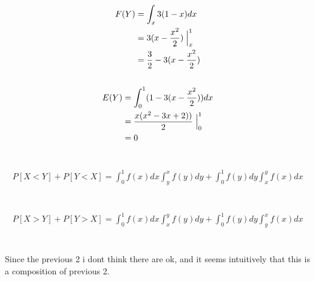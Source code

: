 \documentclass[12pt, a4paper]{article}
\begin{document}
\subsection{}
\begin{subequations}
  \begin{align}
    F(Y) &= \int_x 3(1 - x) dx \\
         &= 3(x - \frac{x^2}{2})\Bigm|_x^1\\
         &= \frac{3}{2} - 3(x - \frac{x^2}{2})
  \end{align}
\end{subequations}

\subsection{}
\begin{subequations}
  \begin{align}
    E(Y) &= \int_0^1 (1-3(x - \frac{x^2}{2})) dx \\
         &= \frac{x(x^2 - 3x + 2))}{2}\Bigm|_0^1\\
         &= 0
  \end{align}
\end{subequations}

\section{}
\begin{subequations}
  \begin{align}
    P[X < Y] + P[Y < X] = \int_0^1 f(x)dx \int_y^x f(y)dy + \int_0^1 f(y)dy \int_x^y f(x)dx
  \end{align}
\end{subequations}

\section{}
\begin{subequations}
  \begin{align}
    P[X > Y] + P[Y > X] = \int_0^1 f(x)dx \int_x^y f(y)dy + \int_0^1 f(y)dy \int_y^x f(x)dx
  \end{align}
\end{subequations}

\section{}
Since the previous 2 i dont think there are ok, and it seems intuitively that this is a composition of previous 2.
\end{document}
